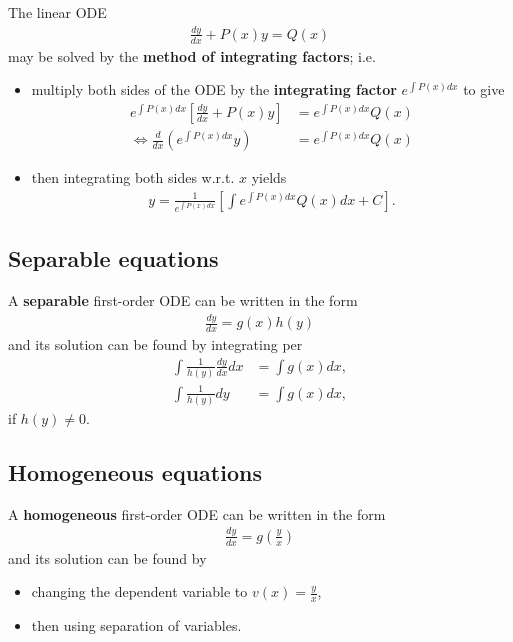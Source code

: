 \documentclass{article}
\begin{document}
\begin{theorem}
	The linear ODE
	\begin{align*}
		\frac{dy}{dx}+P(x)y = Q(x)
	\end{align*}
	may be solved by the \textbf{method of integrating factors}; i.e.
	\begin{itemize}
		\item multiply both sides of the ODE by the \textbf{integrating factor} $e^{\int P(x)dx}$ to give\begin{align*}
			      e^{\int P(x)dx}\left[\frac{dy}{dx}+P(x)y\right]           & = e^{\int P(x)dx}Q(x) \\
			      \Leftrightarrow \frac{d}{dx}\left(e^{\int P(x)dx}y\right) & =e^{\int P(x)dx}Q(x)
		      \end{align*}
		\item then integrating both sides w.r.t. $x$ yields \begin{align*}
			      y = \frac{1}{e^{\int P(x)dx}}\left[\int e^{\int P(x)dx}Q(x)dx + C\right].
		      \end{align*}
	\end{itemize}
\end{theorem}


\subsection{Separable equations}


\begin{theorem}
	A \textbf{separable} first-order ODE can be written in the form
	\begin{align*}
		\frac{dy}{dx}=g(x)h(y)
	\end{align*}
	and its solution can be found by integrating per
	\begin{align*}
		\int \frac{1}{h(y)}\frac{dy}{dx}dx & = \int g(x)dx, \\
		\int \frac{1}{h(y)}dy              & = \int g(x)dx,
	\end{align*}
	if $h(y)\not=0$.
\end{theorem}


\subsection{Homogeneous equations}


\begin{theorem}
	A \textbf{homogeneous} first-order ODE can be written in the form
	\begin{align*}
		\frac{dy}{dx} = g\left(\frac{y}{x}\right)
	\end{align*}
	and its solution can be found by
	\begin{itemize}
		\item changing the dependent variable to $v(x)=\frac{y}{x}$,
		\item then using separation of variables.
	\end{itemize}
\end{theorem}
\end{document}
